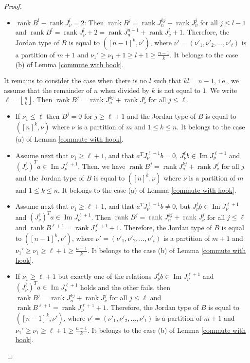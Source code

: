 \documentclass[11pt]{amsproc}
\DeclareMathOperator{\im}{Im}
\DeclareMathOperator{\rank}{rank}
\begin{document}
\begin{proof}
\begin{itemize}
\item[(iii)] $\rank B^l-\rank J_{\nu}^l=2$: Then $\rank B^j=\rank J_n^{kj}+\rank J_{\nu}^j $ for all $j\leq l-1$ and $\rank B^l=\rank J_{\nu}^l+2=\rank J_n^{n-1}+\rank J_{\nu}^l+1$. Therefore, the Jordan type of $B$ is equal to $([n-1]^k,\nu')$, where $\nu'=(\nu'_1,\nu'_2,\ldots,\nu'_t)$ is a partition of $m+1$ and $\nu_1'\ge\nu_1+1\ge l+1\ge \frac{n-1}{k} $. It belongs to the case (b) of Lemma \ref{commute with hook}.

\end{itemize}

It remains to consider the case when there is no $l$ such that $kl=n-1$, i.e., we assume that the remainder of $n$ when divided by $k$ is not equal to $1$. We write $\ell=\left\lfloor{\frac{n}{k}}\right\rfloor$. Then 
$\rank B^j=\rank J_n^{kj}+\rank J_{\nu}^j $ for all $j\leq \ell$. 

\begin{itemize}
    \item[(i)] If $\nu_1\leq\ell$ then $B^j=0$ for $j\ge\ell +1$ and the Jordan type of $B$ is equal to $\left([n]^k,\nu\right)$ where $\nu$ is a partition of $m$ and $1\leq k\leq n$. It belongs to the case (a) of Lemma \ref{commute with hook}.

\item[(ii)] Assume next that $\nu_1\ge\ell+1$, and that $a^TJ_{\nu}^{\ell-1}b=0 $, $J_{\nu}^{\ell}b\in\im J_{\nu}^{\ell +1} $ and $\left(J_{\nu}^{\ell}\right)^Ta\in\im J_{\nu}^{\ell +1} $. Then, we have $\rank B^j=\rank J_n^{kj}+\rank J_{\nu}^j$  for all $j$ and the Jordan type of $B$ is equal to $\left([n]^k,\nu\right)$ where $\nu$ is a partition of $m$ and $1\leq k\leq n$. It belongs to the case (a) of Lemma \ref{commute with hook}.

\item[(iii)] Assume next that $\nu_1\ge\ell+1$, and that $a^TJ_{\nu}^{\ell-1}b\neq 0 $, but $J_{\nu}^{\ell}b\in\im J_{\nu}^{\ell+1}$ and $\left(J_{\nu}^{\ell}\right)^Ta\in\im J_{\nu}^{\ell+1}  $. Then $\rank B^j=\rank J_n^{kj}+\rank J_{\nu}^j $ for all $j\leq \ell$ and $\rank B^{\ell +1} =\rank J_{\nu}^{\ell +1} +1$. Therefore, the Jordan type of $B$ is equal to $([n-1]^k,\nu')$, where $\nu'=(\nu'_1,\nu'_2,\ldots,\nu'_t)$ is a partition of $m+1$ and $\nu_1'\ge\nu_1\ge \ell+1\ge \frac{n-1}{k} $. It belongs to the case (b) of Lemma \ref{commute with hook}.

\item[(iv)] If $\nu_1\ge\ell + 1$ but exactly one of the relations $J_{\nu}^{\ell}b\in\im J_{\nu}^{\ell +1}$ and $\left(J_{\nu}^{\ell}\right)^Ta\in\im J_{\nu}^{\ell +1} $ holds and the other fails, then $\rank B^j=\rank J_n^{kj}+\rank J_{\nu}^j $ for all $j\leq \ell$ and $\rank B^{\ell +1} =\rank J_{\nu}^{\ell +1} +1$. Therefore, the Jordan type of $B$ is equal to $([n-1]^k,\nu')$, where $\nu'=(\nu'_1,\nu'_2,\ldots,\nu'_t)$ is a partition of $m+1$ and $\nu_1'\ge\nu_1\ge \ell+1\ge \frac{n-1}{k} $. It belongs to the case (b) of Lemma \ref{commute with hook}.


\end{itemize}
\end{proof}
\end{document}
